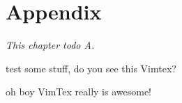 \chapter{Appendix}%
\label{chap:appendix}
\textit{This chapter todo A.\bs}


%
%
test some stuff, do you see this Vimtex?

oh boy VimTex really is awesome!

